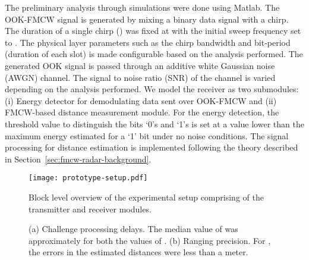 \documentclass{sig-alternate-10pt}
\begin{document}
The preliminary analysis through simulations were done using Matlab. The
OOK-FMCW signal is generated by mixing a binary data signal with a chirp. The
duration of a single chirp () was fixed at  with the initial
sweep frequency  set to . The physical layer parameters such
as the chirp bandwidth  and bit-period (duration of each slot)  is
made configurable based on the analysis performed. The generated OOK signal is
passed through an additive white Gaussian noise (AWGN) channel. The signal to
noise ratio (SNR) of the channel is varied depending on the analysis performed.
We model the receiver as two submodules: (i) Energy detector for demodulating
data sent over OOK-FMCW and (ii) FMCW-based distance measurement module. For the
energy detection, the threshold value to distinguish the bits `0's and `1's is
set at a value  lower than the maximum energy estimated for a `1'
bit under no noise conditions. The signal processing for distance estimation is
implemented following the theory described in
Section~\ref{sec:fmcw-radar-background}.

\begin{figure}[t]
  \centering
  \texttt{[image: prototype-setup.pdf]}
  \caption{Block level overview of the experimental setup comprising of the
    transmitter and receiver modules.}
  \label{fig:prototype-setup}
\end{figure}


\begin{figure*}[t]
  \centering {}
  \hspace{0.02\textwidth} 
 
\caption{(a) Challenge processing delays. The median value of  was
  approximately  for both the values of . (b) Ranging precision. For , the errors in
  the estimated distances were less than a meter.}
  \label{fig:exp-results}
\end{figure*}
\end{document}
